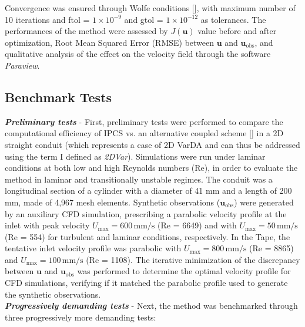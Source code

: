 Convergence was ensured through Wolfe conditions [\cite{Nocedal2006}], with maximum number of 10 iterations and ftol = $1 \times 10^{-9}$ and gtol = $1 \times 10^{-12}$ as tolerances.
The performances of the method were assessed by $J(\textbf{u})$ value before and after optimization, Root Mean Squared Error (RMSE) between \( \mathbf{u}\) and \( \mathbf{u}_{\text{obs}} \), and qualitative analysis of the effect on the velocity field through the software \emph{Paraview}.

\subsection*{Benchmark Tests}

\label{sec:bench}
\textbf{\textit{Preliminary tests}} - 
First, preliminary tests were performed to compare the computational efficiency of IPCS vs. an alternative coupled scheme [\cite{Figueroa2006}] in a 2D straight conduit (which represents a case of 2D VarDA and can thus be addressed using the term I defined as \emph{2DVar}). Simulations were run under laminar conditions at both low and high Reynolds numbers (Re), in order to evaluate the method in laminar and transitionally unstable regimes.  
The conduit was a longitudinal section of a cylinder with a diameter of 41 mm and a length of 200 mm, made of 4,967 mesh elements. Synthetic observations (\( \mathbf{u}_{\text{obs}} \)) were generated by an auxiliary CFD simulation, prescribing a parabolic velocity profile at the inlet with peak velocity \( U_{\text{max}} = 600 \, \text{mm/s} \) (Re = 6649) and with \( U_{\text{max}} = 50 \, \text{mm/s} \) (Re = 554) for turbulent and laminar conditions, respectively.
In the Tape, the tentative inlet velocity profile was parabolic with \( U_{\text{max}} = 800 \, \text{mm/s} \) (Re = 8865) and \( U_{\text{max}} = 100 \, \text{mm/s} \) (Re = 1108).
The iterative minimization of the discrepancy between \( \mathbf{u} \) and \( \mathbf{u}_{\text{obs}} \) was performed to determine the optimal velocity profile for CFD simulations, verifying if it matched the parabolic profile used to generate the synthetic observations.\\


\textbf{\textit{Progressively demanding tests}} - Next, the method was benchmarked through three progressively more demanding tests:

